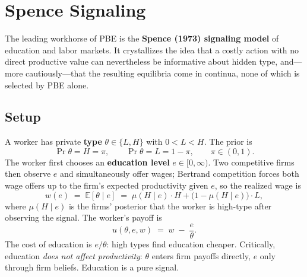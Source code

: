 \section{Spence Signaling}

The leading workhorse of PBE is the \textbf{Spence (1973) signaling model} of education and labor markets. It crystallizes the idea that a costly action with no direct productive value can nevertheless be informative about hidden type, and---more cautiously---that the resulting equilibria come in continua, none of which is selected by PBE alone.

\subsection{Setup}

A worker has private \textbf{type} $\theta \in \{L, H\}$ with $0 < L < H$. The prior is
\[
  \Pr{\theta = H} = \pi, \qquad \Pr{\theta = L} = 1 - \pi, \qquad \pi \in (0, 1).
\]
The worker first chooses an \textbf{education level} $e \in [0, \infty)$. Two competitive firms then observe $e$ and simultaneously offer wages; Bertrand competition forces both wage offers up to the firm's expected productivity given $e$, so the realized wage is
\[
  w(e) \;=\; \mathbb{E}[\theta \mid e] \;=\; \mu(H \mid e) \cdot H + \bigl(1 - \mu(H \mid e)\bigr) \cdot L,
\]
where $\mu(H \mid e)$ is the firms' posterior that the worker is high-type after observing the signal. The worker's payoff is
\[
  u(\theta, e, w) \;=\; w \;-\; \frac{e}{\theta}.
\]
The cost of education is $e/\theta$: high types find education cheaper. Critically, education \emph{does not affect productivity}: $\theta$ enters firm payoffs directly, $e$ only through firm beliefs. Education is a pure signal.


